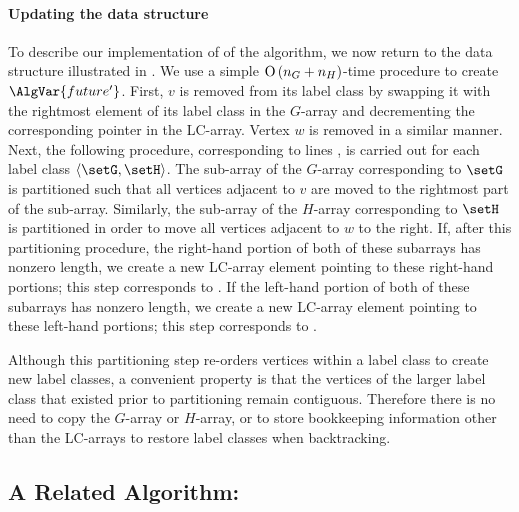 \paragraph{Updating the data structure}
To describe
our implementation of  of the algorithm,
we now return to the data structure illustrated in .
We use a simple $\operatorname{O}\left(n_G+n_H\right)$-time procedure to create $\AlgVar{future'}$.
First, $v$ is removed from its label class by swapping it with the rightmost
element of its label class in the $G$-array and decrementing the corresponding
pointer in the LC-array. Vertex $w$ is removed in a similar manner.
Next, the following procedure, corresponding to lines ,
is carried out for each label class $\langle \setG,\setH \rangle$.  The sub-array
of the $G$-array corresponding to $\setG$ is partitioned such that all vertices adjacent to $v$ are moved to
the rightmost part of the sub-array. Similarly, the sub-array of the $H$-array corresponding to $\setH$
is partitioned in order to move all vertices adjacent to $w$ to the right.
If, after this partitioning procedure, the right-hand portion of both of these subarrays
has nonzero length, we create a new LC-array element pointing to these right-hand portions;
this step corresponds to .
If the left-hand portion of both of these subarrays
has nonzero length, we create a new LC-array element pointing to these left-hand portions;
this step corresponds to .

Although this partitioning step re-orders vertices within a label class
to create new label classes, a convenient property is that the vertices
of the larger label class that existed prior to partitioning remain contiguous.
Therefore there is no need
to copy the $G$-array or $H$-array, or to store bookkeeping information
other than the LC-arrays to restore label classes when backtracking.

\subsection{A Related Algorithm: \citet{DBLP:journals/jacm/SchmidtD76}}

